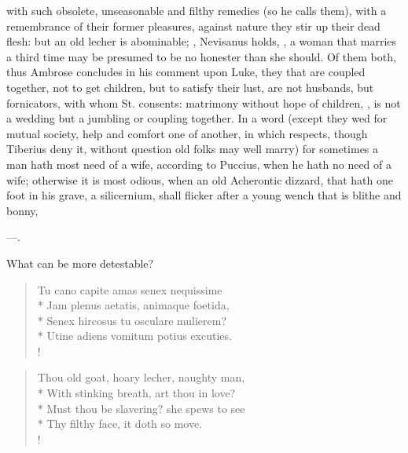 with such obsolete, unseasonable and filthy remedies (so he calls
them), with a remembrance of their former pleasures, against nature
they stir up their dead flesh: but an old lecher is abominable; , Nevisanus holds, , a woman that marries a third time may be presumed to be no
honester than she should. Of them both, thus Ambrose concludes in his
comment upon Luke, they that are coupled together, not to get
children, but to satisfy their lust, are not husbands, but fornicators,
with whom St. \Austin{} consents: matrimony without hope of children, , is not a wedding but a jumbling
or coupling together. In a word (except they wed for mutual society,
help and comfort one of another, in which respects, though
Tiberius deny it, without question old folks may well marry) for
sometimes a man hath most need of a wife, according to Puccius, when he
hath no need of a wife; otherwise it is most odious, when an old
Acherontic dizzard, that hath one foot in his grave, a silicernium,
shall flicker after a young wench that is blithe and bonny,

---.

What can be more detestable?
%
\begin{latin}%
\begin{verse}%
Tu cano capite amas senex nequissime\\*
Jam plenus aetatis, animaque foetida,\\*
Senex hircosus tu osculare mulierem?\\*
Utine adiens vomitum potius excuties.\\!
\end{verse}%
\end{latin}%
\translationrule%
\begin{verse}%
Thou old goat, hoary lecher, naughty man,\\*
With stinking breath, art thou in love?\\*
Must thou be slavering? she spews to see\\*
Thy filthy face, it doth so move.\\!
\end{verse}%
%

